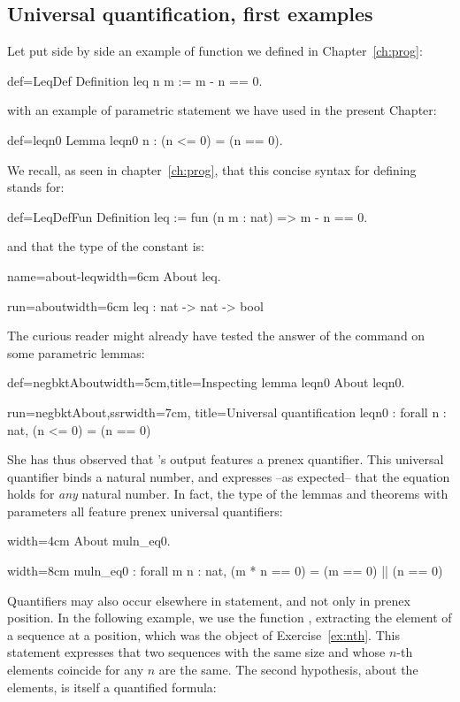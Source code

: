 \subsection{Universal quantification, first examples}

Let put side by side an example of function we defined in
Chapter~\ref{ch:prog}:

\begin{coq}{def=LeqDef}{}
Definition leq n m := m - n == 0.
\end{coq}
with an example of parametric statement we have used in the present
Chapter:

\begin{coq}{def=leqn0}{}
Lemma leqn0 n : (n <= 0) = (n == 0).
\end{coq}

We recall, as seen in chapter~\ref{ch:prog}, that this concise syntax
for defining  stands for:

\begin{coq}{def=LeqDefFun}{}
Definition leq := fun (n m : nat) => m - n == 0.
\end{coq}
and that the type of the constant  is:

\begin{coq}{name=about-leq}{width=6cm}
About leq.
\end{coq}
\begin{coqout}{run=about}{width=6cm}
leq : nat -> nat -> bool
\end{coqout}

The curious reader might already have tested the answer of the
 command on some parametric lemmas:

\begin{coq}{def=negbktAbout}{width=5cm,title=Inspecting lemma leqn0}
About leqn0.
\end{coq}
\begin{coqout}{run=negbktAbout,ssr}{width=7cm, title=Universal quantification}
leqn0 : forall n : nat, (n <= 0) = (n == 0)
\end{coqout}

She has thus observed that \Coq{}'s output features a prenex
 quantifier. This universal quantifier binds a natural number, and
expresses --as expected-- that the equation holds for \emph{any}
natural number. In fact, the type of the lemmas and theorems with
parameters all feature prenex universal quantifiers:

\begin{coq}{}{width=4cm}
About muln_eq0.
$~$
\end{coq}
\begin{coqout}{}{width=8cm}
muln_eq0 : forall m n : nat,
  (m * n == 0) = (m == 0) || (n == 0)
\end{coqout}
Quantifiers may also occur elsewhere in statement, and not only in
prenex position.  In the following example, we use the function
, extracting the element of a sequence at a position, which was
the object of Exercise~\ref{ex:nth}. This statement expresses that two
sequences with the same size and whose $n$-th elements coincide for any
$n$ are the same. The second hypothesis, about the elements, is
itself a quantified formula:


